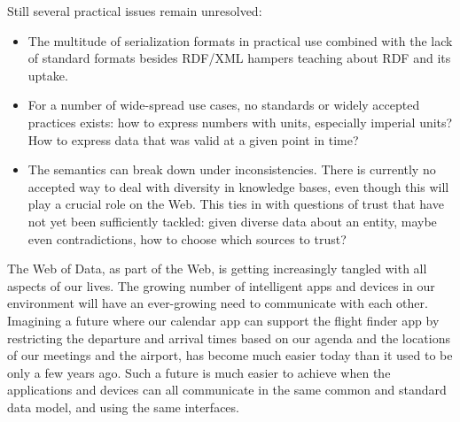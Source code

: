 Still several practical issues remain unresolved:
\begin{itemize}
\item The multitude of serialization formats in practical use combined with the lack of standard formats besides RDF/XML hampers teaching about \ac{RDF} and its uptake.
\item For a number of wide-spread use cases, no standards or widely accepted practices exists: how to express numbers with units, especially imperial units? How to express data that was valid at a given point in time? %
\item The semantics can break down under inconsistencies. There is currently no accepted way to deal with diversity in knowledge bases, even though this will play a crucial role on the Web. This ties in with questions of trust that have not yet been sufficiently tackled: given diverse data about an entity, maybe even contradictions, how to choose which sources to trust? %
\end{itemize}

The Web of Data, as part of the Web, is getting increasingly tangled with all aspects of our lives.
The growing number of intelligent apps and devices in our environment will have an ever-growing need to communicate with each other.
Imagining a future where our calendar app can support the flight finder app by restricting the departure and arrival times based on our agenda and the locations of our meetings and the airport, has become much easier today than it used to be only a few years ago.
Such a future is much easier to achieve when the applications and devices can all communicate in the same common and standard data model, and using the same interfaces.

